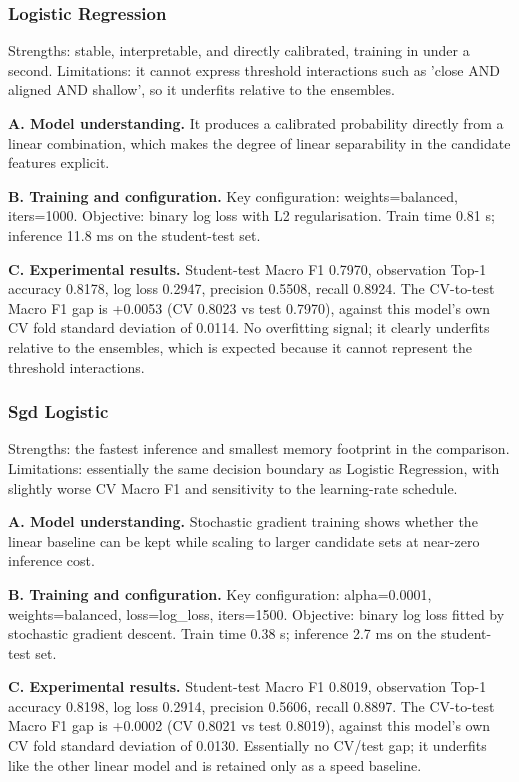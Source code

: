 \documentclass[11pt,a4paper]{article}
\begin{document}
\subsubsection{Logistic Regression}

Strengths: stable, interpretable, and directly calibrated, training in under a second. Limitations: it cannot express threshold interactions such as 'close AND aligned AND shallow', so it underfits relative to the ensembles.

\noindent\textbf{A. Model understanding.} It produces a calibrated probability directly from a linear combination, which makes the degree of linear separability in the candidate features explicit.

\noindent\textbf{B. Training and configuration.} Key configuration: weights=balanced, iters=1000. Objective: binary log loss with L2 regularisation. Train time 0.81 s; inference 11.8 ms on the student-test set.

\noindent\textbf{C. Experimental results.} Student-test Macro F1 0.7970, observation Top-1 accuracy 0.8178, log loss 0.2947, precision 0.5508, recall 0.8924. The CV-to-test Macro F1 gap is +0.0053 (CV 0.8023 vs test 0.7970), against this model's own CV fold standard deviation of 0.0114. No overfitting signal; it clearly underfits relative to the ensembles, which is expected because it cannot represent the threshold interactions.

\subsubsection{Sgd Logistic}

Strengths: the fastest inference and smallest memory footprint in the comparison. Limitations: essentially the same decision boundary as Logistic Regression, with slightly worse CV Macro F1 and sensitivity to the learning-rate schedule.

\noindent\textbf{A. Model understanding.} Stochastic gradient training shows whether the linear baseline can be kept while scaling to larger candidate sets at near-zero inference cost.

\noindent\textbf{B. Training and configuration.} Key configuration: alpha=0.0001, weights=balanced, loss=log\_loss, iters=1500. Objective: binary log loss fitted by stochastic gradient descent. Train time 0.38 s; inference 2.7 ms on the student-test set.

\noindent\textbf{C. Experimental results.} Student-test Macro F1 0.8019, observation Top-1 accuracy 0.8198, log loss 0.2914, precision 0.5606, recall 0.8897. The CV-to-test Macro F1 gap is +0.0002 (CV 0.8021 vs test 0.8019), against this model's own CV fold standard deviation of 0.0130. Essentially no CV/test gap; it underfits like the other linear model and is retained only as a speed baseline.
\end{document}
